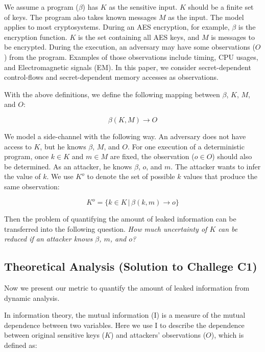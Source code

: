 We assume a program ($\beta$) has $K$ as the sensitive input. $K$ should be a
finite set of keys. The program also takes known messages $M$ as the input. The
model applies to most cryptosystems. During an AES encryption, for example, 
$\beta$ is the encryption function. $K$ is the set containing all AES keys, 
and $M$ is messages to be
encrypted. During the execution, an adversary may have some observations ($O$)
from the program. Examples of those observations include timing, CPU usages, and
Electromagnetic signals (EM). In this paper, we consider secret-dependent
control-flows and secret-dependent memory accesses as observations.

With the above definitions, we define the following mapping between $\beta$,
$K$, $M$, and $O$:

\begin{displaymath}
    \beta(K, M) \rightarrow O
\end{displaymath}

We model a side-channel with the following way. An adversary does not have
access to $K$, but he knows $\beta$, $M$, and $O$. For one execution of a
deterministic program, once $k \in K$ and $m \in M$ are fixed, the observation
($o \in O$) should also be determined. As an attacker, he knows $\beta$, $o$,
and $m$. The attacker wants to infer the value of $k$. We use $K^o$ to denote
the set of possible $k$ values that produce the same observation:

\begin{displaymath}
    K^o = \{ k \in K \, |\, \beta(k, m) \rightarrow o\}
\end{displaymath}

Then the problem of quantifying the amount of leaked information can be
transferred into the following question.
\emph{How much uncertainty of $K$ can be reduced if an attacker knows $\beta$, $m$, and $o$?}

\subsection{Theoretical Analysis \textbf{(Solution to Challege C1)}}
Now we present our metric to quantify the amount of leaked information from
dynamic analysis.

In information theory, the mutual information (I) is a measure of the mutual
dependence between two variables. Here we use I to describe the
dependence between original sensitive keys ($K$) and attackers' observations ($O$), 
which is defined as:


